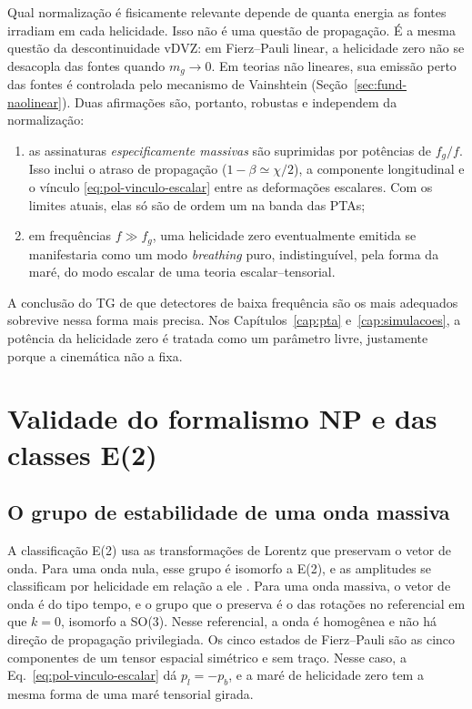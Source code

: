 Qual normalização é fisicamente relevante depende de quanta energia as
fontes irradiam em cada helicidade. Isso não é uma questão de
propagação. É a mesma questão da descontinuidade vDVZ: em Fierz--Pauli
linear, a helicidade zero não se desacopla das fontes quando
$m_g\to0$. Em teorias não lineares, sua emissão perto das fontes é
controlada pelo mecanismo de Vainshtein (Seção~\ref{sec:fund-naolinear}). Duas afirmações
são, portanto, robustas e independem da normalização:
\begin{enumerate}
 \item as assinaturas \emph{especificamente massivas} são suprimidas por
 potências de $f_g/f$. Isso inclui o atraso de propagação
 ($1-\beta\simeq\chi/2$), a componente longitudinal e o vínculo
 \eqref{eq:pol-vinculo-escalar} entre as deformações escalares. Com os
 limites atuais, elas só são de ordem um na banda das PTAs;
 \item em frequências $f\gg f_g$, uma helicidade zero eventualmente
 emitida se manifestaria como um modo \emph{breathing} puro,
 indistinguível, pela forma da maré, do modo escalar de uma teoria
 escalar--tensorial.
\end{enumerate}
A conclusão do TG de que detectores de baixa frequência são os mais
adequados sobrevive nessa forma mais precisa. Nos Capítulos~\ref{cap:pta}
e~\ref{cap:simulacoes}, a potência da helicidade zero é tratada como um
parâmetro livre, justamente porque a cinemática não a fixa.

\section{Validade do formalismo NP e das classes E(2)}

\subsection{O grupo de estabilidade de uma onda massiva}
\label{sec:pol-grupo}

A classificação E(2) usa as transformações de Lorentz que preservam o
vetor de onda. Para uma onda nula, esse grupo é isomorfo a E(2), e as
amplitudes se classificam por helicidade em relação a ele
\autocite{eardley1973}. Para uma onda massiva, o vetor de onda é do tipo
tempo, e o grupo que o preserva é o das rotações no referencial em que
$k=0$, isomorfo a SO(3). Nesse referencial, a onda é homogênea e não há
direção de propagação privilegiada. Os cinco estados de Fierz--Pauli
são as cinco componentes de um tensor espacial simétrico e sem traço.
Nesse caso, a Eq.~\eqref{eq:pol-vinculo-escalar} dá $p_l=-p_b$, e a
maré de helicidade zero tem a mesma forma de uma maré tensorial girada.

